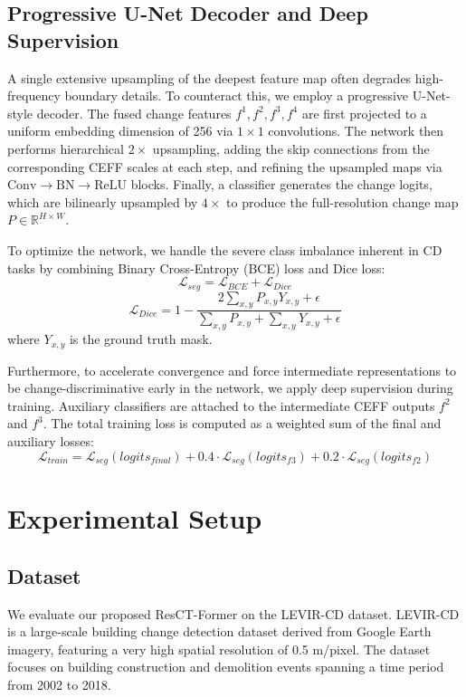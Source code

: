 \documentclass[conference]{IEEEtran}
\begin{document}
\subsection{Progressive U-Net Decoder and Deep Supervision}

A single extensive upsampling of the deepest feature map often degrades high-frequency boundary details. To counteract this, we employ a progressive U-Net-style decoder. The fused change features $f^1, f^2, f^3, f^4$ are first projected to a uniform embedding dimension of 256 via $1 \times 1$ convolutions. The network then performs hierarchical $2\times$ upsampling, adding the skip connections from the corresponding CEFF scales at each step, and refining the upsampled maps via $\text{Conv}\to\text{BN}\to\text{ReLU}$ blocks. Finally, a classifier generates the change logits, which are bilinearly upsampled by $4\times$ to produce the full-resolution change map $P \in \mathbb{R}^{H \times W}$.

To optimize the network, we handle the severe class imbalance inherent in CD tasks by combining Binary Cross-Entropy (BCE) loss and Dice loss:
\begin{equation}
\mathcal{L}_{seg} = \mathcal{L}_{BCE} + \mathcal{L}_{Dice}
\end{equation}
\begin{equation}
\mathcal{L}_{Dice} = 1 - \frac{2\sum_{x,y}P_{x,y}Y_{x,y}+\epsilon}{\sum_{x,y}P_{x,y} + \sum_{x,y}Y_{x,y} + \epsilon}
\end{equation}
where $Y_{x,y}$ is the ground truth mask. 

Furthermore, to accelerate convergence and force intermediate representations to be change-discriminative early in the network, we apply deep supervision during training. Auxiliary classifiers are attached to the intermediate CEFF outputs $f^2$ and $f^3$. The total training loss is computed as a weighted sum of the final and auxiliary losses:
\begin{equation}
\mathcal{L}_{train} = \mathcal{L}_{seg}(logits_{final}) + 0.4 \cdot \mathcal{L}_{seg}(logits_{f3}) + 0.2 \cdot \mathcal{L}_{seg}(logits_{f2})
\end{equation}

\section{Experimental Setup}

\subsection{Dataset}
We evaluate our proposed ResCT-Former on the LEVIR-CD dataset. LEVIR-CD is a large-scale building change detection dataset derived from Google Earth imagery, featuring a very high spatial resolution of 0.5 m/pixel. The dataset focuses on building construction and demolition events spanning a time period from 2002 to 2018. 
\end{document}
